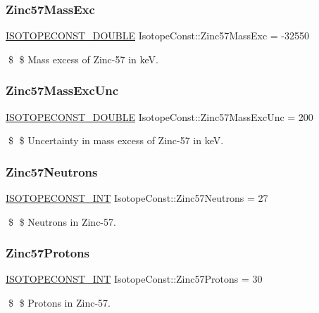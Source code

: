 \subsubsection{\texorpdfstring{Zinc57\+Mass\+Exc}{Zinc57MassExc}}
{\footnotesize\ttfamily \mbox{\hyperlink{group___isotope_const-_macros_ga8f45a7272ce02c0b4c65c44636ed719a}{I\+S\+O\+T\+O\+P\+E\+C\+O\+N\+S\+T\+\_\+\+D\+O\+U\+B\+LE}} Isotope\+Const\+::\+Zinc57\+Mass\+Exc = -\/32550}

\$ \$ Mass excess of Zinc-\/57 in keV. \mbox{\label{group___isotope_const-_zinc-_zn57_ga81b9f6afeae768be23dd68808efe7bd1}} 
\subsubsection{\texorpdfstring{Zinc57\+Mass\+Exc\+Unc}{Zinc57MassExcUnc}}
{\footnotesize\ttfamily \mbox{\hyperlink{group___isotope_const-_macros_ga8f45a7272ce02c0b4c65c44636ed719a}{I\+S\+O\+T\+O\+P\+E\+C\+O\+N\+S\+T\+\_\+\+D\+O\+U\+B\+LE}} Isotope\+Const\+::\+Zinc57\+Mass\+Exc\+Unc = 200}

\$ \$ Uncertainty in mass excess of Zinc-\/57 in keV. \mbox{\label{group___isotope_const-_zinc-_zn57_gaf8614a2982e84896109acea26d257f91}} 
\subsubsection{\texorpdfstring{Zinc57\+Neutrons}{Zinc57Neutrons}}
{\footnotesize\ttfamily \mbox{\hyperlink{group___isotope_const-_macros_ga5f18360b3e99483a35c32d789e62621c}{I\+S\+O\+T\+O\+P\+E\+C\+O\+N\+S\+T\+\_\+\+I\+NT}} Isotope\+Const\+::\+Zinc57\+Neutrons = 27}

\$ \$ Neutrons in Zinc-\/57. \mbox{\label{group___isotope_const-_zinc-_zn57_gaba2e2d47e79d855af98a0ee4ad28c1e5}} 
\subsubsection{\texorpdfstring{Zinc57\+Protons}{Zinc57Protons}}
{\footnotesize\ttfamily \mbox{\hyperlink{group___isotope_const-_macros_ga5f18360b3e99483a35c32d789e62621c}{I\+S\+O\+T\+O\+P\+E\+C\+O\+N\+S\+T\+\_\+\+I\+NT}} Isotope\+Const\+::\+Zinc57\+Protons = 30}

\$ \$ Protons in Zinc-\/57. 